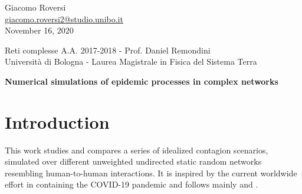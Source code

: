 \documentclass[DIV=12, BCOR=0pt]{scrartcl}  %
\begin{document}
%	
%



\begin{flushright}
	{\large Giacomo Roversi} \\ 
	{\small \href{mailto:giacomo.roversi2@studio.unibo.it}{giacomo.roversi2@studio.unibo.it} }\\
	\vskip0.15in
	{\large November 16, 2020}
\end{flushright}

\begin{flushleft}
	{\Large \color{gray}
		Reti complesse A.A. 2017-2018 - Prof. Daniel Remondini  \\
		Università di Bologna - Laurea Magistrale in Fisica del Sistema Terra}


	\vskip0.2in
	{\huge\textbf{Numerical simulations of epidemic processes in complex networks}} 
	\vskip0.33in
	
\end{flushleft}
	
	\section*{Introduction}
	\label{sec:intro}
	This work studies and compares a series of idealized contagion scenarios, simulated over different unweighted undirected static random networks resembling human-to-human interactions. It is inspired by the current worldwide effort in containing the COVID-19 pandemic and follows mainly \citet{PastorSatorras} and \citep{Firth2020}.
	
\end{document}
